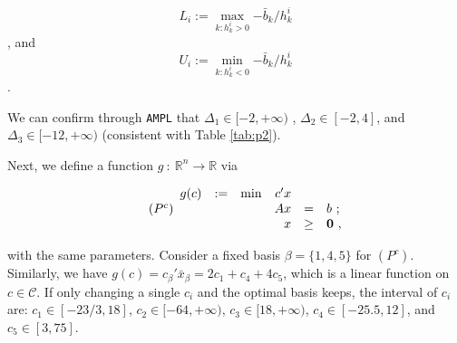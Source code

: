 $$L_i := \max_{k:h_k^i>0} {-\bar{b}_k/h_k^i}$$, and $$U_i := \min_{k:h_k^i<0} {-\bar{b}_k/h_k^i}$$.

We can confirm through {\tt AMPL} that $\Delta_1 \in [-2,+\infty)$ , $\Delta_2 \in [-2,4]$, and $\Delta_3 \in [-12,+\infty)$ (consistent with Table \ref{tab:p2}).

Next, we define a function $g~:~\mathbb{R}^n \rightarrow \mathbb{R}$ via

\[
\tag{$P^{c}$}
\begin{array}{ccrrcl}
g(c) & := & \min & c'x  &      &   \\
   &&   &  Ax  &   =  & b~; \\
   &&   &   x  & \geq & \mathbf{0}~,
\end{array}
\]

with the same parameters. Consider a fixed basis $\beta = \{1,4,5\}$ for $(P^{c})$. Similarly, we have $g(c) = c_\beta'\bar{x}_\beta = 2c_1+c_4+4c_5$, which is a linear function on $c\in\mathcal{C}$. If only changing a single $c_i$ and the optimal basis keeps, the interval of $c_i$ are: $c_1\in [-23/3,18]$, $c_2\in[-64,+\infty)$, $c_3\in[18, +\infty)$, $c_4\in[-25.5,12]$, and $c_5\in[3,75]$.